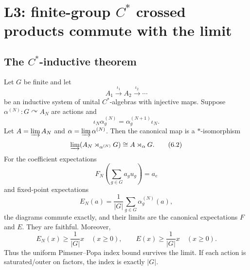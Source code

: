 \section{\texorpdfstring{L3: finite-group $C^*$ crossed products commute with the limit}{L3: finite-group crossed products commute with the limit}}
\label{sec:L3}

\subsection{\texorpdfstring{The $C^*$-inductive theorem}{The C-star inductive theorem}}

\begin{theorem}
\label{thm:crossedlimit}
Let $G$ be finite and let
\[
 A_1\xrightarrow{\iota_1}A_2\xrightarrow{\iota_2}\cdots
\]
be an inductive system of unital $C^*$-algebras with injective maps.
Suppose $\alpha^{(N)}:G\curvearrowright A_N$ are actions and
\[
 \iota_N\alpha_g^{(N)}
 =\alpha_g^{(N+1)}\iota_N .
\tag{6.1}\label{eq:equivariance}
\]
Let $A=\varinjlim A_N$ and $\alpha=\varinjlim\alpha^{(N)}$.  Then the
canonical map is a $*$-isomorphism
\[
 \varinjlim(A_N\rtimes_{\alpha^{(N)}}G)
 \cong A\rtimes_\alpha G.
\tag{6.2}\label{eq:crossediso}
\]
For the coefficient expectations
\[
 F_N\!\left(\sum_{g\in G}a_gu_g\right)=a_e
\tag{6.3}\label{eq:coeffE}
\]
and fixed-point expectations
\[
 E_N(a)=\frac1{|G|}\sum_{g\in G}\alpha_g^{(N)}(a),
\tag{6.4}\label{eq:fixedE}
\]
the diagrams commute exactly, and their limits are the canonical
expectations $F$ and $E$.  They are faithful.  Moreover,
\[
 E_N(x)\ge\frac1{|G|}x\quad(x\ge0),
\qquad
 E(x)\ge\frac1{|G|}x\quad(x\ge0).
\tag{6.5}\label{eq:PP}
\]
Thus the uniform Pimsner--Popa index bound survives the limit.  If each
action is saturated/outer on factors, the index is exactly $|G|$.
\end{theorem}

